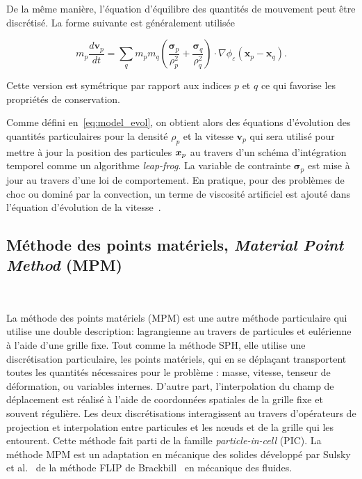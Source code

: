 De la même manière, l'équation d'équilibre des quantités de mouvement peut être discrétisé. La forme suivante est généralement utilisée

\begin{equation*}
    m_p \frac{d \bm v_p}{dt} = \sum_{q} m_p m_q \left(\frac{\bm \sigma_p}{\rho_p^2} + \frac{\bm \sigma_q}{\rho_q^2} \right) \cdot \nabla \phi_\varepsilon(\bm x_p - \bm x_q).
\end{equation*}

Cette version est symétrique par rapport aux indices $p$ et $q$ ce qui favorise les propriétés de conservation.

Comme défini en~\eqref{eq:model_evol}, on obtient alors des équations d'évolution des quantités particulaires pour la densité $\rho_p$ et la vitesse $\bm v_p$ qui sera utilisé pour mettre à jour la position des particules $\bm{x}_p$ au travers d'un schéma d'intégration temporel comme un algorithme \textit{leap-frog}. La variable de contrainte $\bm \sigma_p$ est mise à jour au travers d'une loi de comportement. En pratique, pour des problèmes de choc ou dominé par la convection, un terme de viscosité artificiel est ajouté dans l'équation d'évolution de la vitesse~\cite{MONAGHAN1983374}.

\subsection{Méthode des points matériels, \textit{Material Point Method} (MPM)}~\label{sec:mpm}

La méthode des points matériels (MPM) est une autre méthode particulaire qui utilise une double description: lagrangienne au travers de particules et eulérienne à l'aide d'une grille fixe. Tout comme la méthode SPH, elle utilise une discrétisation particulaire, les points matériels, qui en se déplaçant transportent toutes les quantités nécessaires pour le problème : masse, vitesse, tenseur de déformation, ou variables internes. D'autre part, l'interpolation du champ de déplacement est réalisé à l'aide de coordonnées spatiales de la grille fixe et souvent régulière. Les deux discrétisations interagissent au travers d'opérateurs de projection et interpolation entre particules et les nœuds et de la grille qui les entourent. Cette méthode fait parti de la famille \textit{particle-in-cell} (PIC). La méthode MPM est un adaptation en mécanique des solides développé par Sulsky et al.~\cite{sulsky_particle_1994} de la méthode FLIP de Brackbill~\cite{brackbill_flip_1988} en mécanique des fluides.

